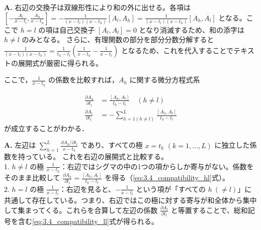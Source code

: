\begin{Q}
\textbf{A.} 右辺の交換子は双線形性により和の外に出せる。各項は
$\left[ -\frac{A_l}{x-t_l}, \frac{A_h}{x-t_h} \right] = -\frac{1}{(x-t_l)(x-t_h)} [A_l, A_h] = \frac{1}{(x-t_l)(x-t_h)} [A_h, A_l]$ 
となる。ここで $h=l$ の項は自己交換子 $[A_l, A_l] = 0$ となり消滅するため、和の添字は $h \neq l$ のみとなる。
さらに、有理関数の部分を部分分数分解すると
$\frac{1}{(x-t_l)(x-t_h)} = \frac{1}{t_h - t_l} \left( \frac{1}{x-t_h} - \frac{1}{x-t_l} \right)$ 
となるため、これを代入することでテキストの展開式が厳密に得られる。
\end{Q}

\begin{story}

ここで，$\frac{1}{x-t_h}$ の係数を比較すれば，$A_h$ に関する微分方程式系

\begin{align}
  \frac{\partial A_h}{\partial t_l} &= \frac{[A_h, A_l]}{t_h - t_l} \quad (h \neq l)\label{eq:3.4_compatibility_hl} \\
  \frac{\partial A_l}{\partial t_l} &= - \sum_{h=1(h \neq l)}^L \frac{[A_h, A_l]}{t_h - t_l}\label{eq:3.4_compatibility_ll}
\end{align}
が成立することがわかる．

\end{story}

\begin{Q}[左辺と右辺の係数比較から、なぜ $h \neq l$ の場合\eqref{eq:eq:3.4_compatibility_hl}と $h=l$ の場合\eqref{eq:3.4_compatibility_ll}の2つの異なる方程式が抽出されるのか？]
\textbf{A.} 左辺は $\sum_{h=1}^L \frac{\partial A_h / \partial t_l}{x-t_h}$ であり、すべての極 $x=t_k$ $(k=1,\dots,L)$ に独立した係数を持っている。
これを右辺の展開式と比較する。\\
1. $h \neq l$ の極 $\frac{1}{x-t_h}$：右辺ではシグマの中の1つの項からしか寄与がない。係数をそのまま比較して $\frac{\partial A_h}{\partial t_l} = \frac{[A_h, A_l]}{t_h - t_l}$ を得る（\eqref{eq:3.4_compatibility_hl}式）。\\
2. $h = l$ の極 $\frac{1}{x-t_l}$：右辺を見ると、$-\frac{1}{x-t_l}$ という項が「すべての $h \ (\neq l)$」に共通して存在している。つまり、右辺ではこの極に対する寄与が和全体から集中して集まってくる。これらを合算して左辺の係数 $\frac{\partial A_l}{\partial t_l}$ と等置することで、総和記号を含む\eqref{eq:3.4_compatibility_ll}式が得られる。
\end{Q}

